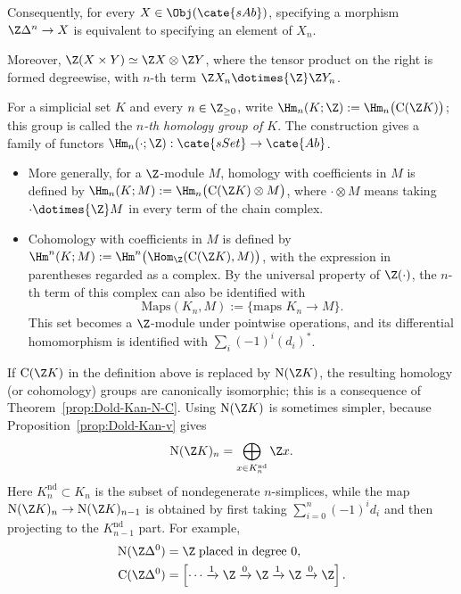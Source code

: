 Consequently, for every $X\in\Obj(\cate{sAb})$, specifying a morphism
$\Z\Delta^n\to X$ is equivalent to specifying an element of $X_n$.

Moreover, $\Z(X\times Y)\simeq\Z X\otimes\Z Y$, where the tensor product on
the right is formed degreewise, with $n$-th term
$\Z X_n\dotimes{\Z}\Z Y_n$.

\begin{definition}\label{def:simplicial-set-homology}
	For a simplicial set $K$ and every $n\in\Z_{\geq0}$, write
	$\Hm_n(K;\Z):=\Hm_n\bigl(\mathrm{C}(\Z K)\bigr)$; this group is called
	the \emph{$n$-th homology group of $K$}. The construction gives a family
	of functors $\Hm_n(\cdot;\Z):\cate{sSet}\to\cate{Ab}$.
	\begin{itemize}
		\item More generally, for a $\Z$-module $M$, homology with coefficients
		in $M$ is defined by
		$\Hm_n(K;M):=\Hm_n\bigl(\mathrm{C}(\Z K)\otimes M\bigr)$, where
		$\mathord\cdot\otimes M$ means taking
		$\mathord\cdot\dotimes{\Z}M$ in every term of the chain complex.

		\item Cohomology with coefficients in $M$ is defined by
		$\Hm^n(K;M):=\Hm^n\bigl(\Hom_{\Z}(\mathrm{C}(\Z K),M)\bigr)$, with
		the expression in parentheses regarded as a complex. By the universal
		property of $\Z(\cdot)$, the $n$-th term of this complex can also be
		identified with
		\[
		\mathrm{Maps}(K_n,M):=\{\text{maps }K_n\to M\}.
		\]
		This set becomes a $\Z$-module under pointwise operations, and its
		differential homomorphism is identified with $\sum_i(-1)^i(d_i)^*$.
	\end{itemize}
\end{definition}

If $\mathrm{C}(\Z K)$ in the definition above is replaced by
$\mathrm{N}(\Z K)$, the resulting homology (or cohomology) groups are
canonically isomorphic; this is a consequence of
Theorem~\ref{prop:Dold-Kan-N-C}. Using $\mathrm{N}(\Z K)$ is sometimes
simpler, because Proposition~\ref{prop:Dold-Kan-v} gives
\[
\mathrm{N}(\Z K)_n=\bigoplus_{x\in K_n^{\mathrm{nd}}}\Z x.
\]
Here $K_n^{\mathrm{nd}}\subset K_n$ is the subset of nondegenerate
$n$-simplices, while the map
$\mathrm{N}(\Z K)_n\to\mathrm{N}(\Z K)_{n-1}$ is obtained by first taking
$\sum_{i=0}^n(-1)^id_i$ and then projecting to the
$K_{n-1}^{\mathrm{nd}}$ part. For example,
\begin{align*}
	\mathrm{N}(\Z\Delta^0)&=\Z\;\text{placed in degree $0$},\\
	\mathrm{C}(\Z\Delta^0)&=
	\left[\cdots\xrightarrow{1}\Z\xrightarrow{0}\Z
	\xrightarrow{1}\Z\xrightarrow{0}\Z\right].
\end{align*}

